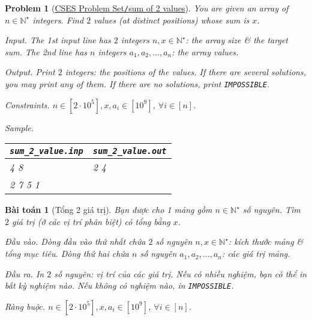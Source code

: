 \documentclass{article}
\newtheorem{baitoan}{Bài toán}
\newtheorem{problem}{Problem}
\begin{document}
\begin{problem}[\href{https://cses.fi/problemset/task/1640}{CSES Problem Set{\tt/}sum of 2 values}]
    You are given an array of $n\in\mathbb{N}^\star$ integers. Find $2$ values (at distinct positions) whose sum is $x$.
    \item {\sf Input.} The 1st input line has $2$ integers $n,x\in\mathbb{N}^\star$: the array size \& the target sum. The 2nd line has $n$ integers $a_1,a_2,\ldots,a_n$: the array values.
    \item {\sf Output.} Print $2$ integers: the positions of the values. If there are several solutions, you may print any of them. If there are no solutions, print {\tt IMPOSSIBLE}.
    \item {\sf Constraints.} $n\in[2\cdot10^5],x,a_i\in[10^9]$, $\forall i\in[n]$.
    \item {\sf Sample.}
    \begin{table}[H]
        \centering
        \begin{tabular}{|l|l|}
            \hline
            \verb|sum_2_value.inp| & \verb|sum_2_value.out| \\
            \hline
            4 8 & 2 4 \\
            2 7 5 1 & \\
            \hline
        \end{tabular}
    \end{table}
\end{problem}

\begin{baitoan}[Tổng 2 giá trị]
    Bạn được cho 1 mảng gồm $n\in\mathbb{N}^\star$ số nguyên. Tìm $2$ giá trị (ở các vị trí phân biệt) có tổng bằng $x$.
    \item {\sf Đầu vào.} Dòng đầu vào thứ nhất chứa $2$ số nguyên $n,x\in\mathbb{N}^\star$: kích thước mảng \& tổng mục tiêu. Dòng thứ hai chứa $n$ số nguyên $a_1,a_2,\ldots,a_n$: các giá trị mảng.
    \item {\sf Đầu ra.} In $2$ số nguyên: vị trí của các giá trị. Nếu có nhiều nghiệm, bạn có thể in bất kỳ nghiệm nào. Nếu không có nghiệm nào, in {\tt IMPOSSIBLE}.
    \item {\sf Ràng buộc.} $n\in[2\cdot10^5],x,a_i\in[10^9]$, $\forall i\in[n]$.
\end{baitoan}
\end{document}
